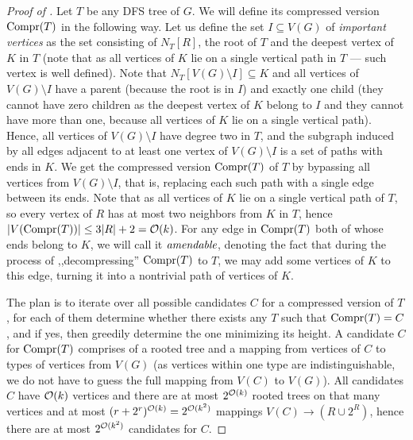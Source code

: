 \documentclass[a4paper,11pt]{article}
\begin{document}
\begin{proof}[Proof of ]
Let $T$ be any DFS tree of $G$. We will define its compressed version $\mathrm{Compr}(T)$ in the following way. Let us define the set $I \subseteq V(G)$ of \emph{important vertices} as the set consisting of $N_T[R]$, the root of $T$ and the deepest vertex of $K$ in $T$ (note that as all vertices of $K$ lie on a single vertical path in $T$ --- such vertex is well defined). Note that $N_T[V(G) \setminus I] \subseteq K$ and all vertices of $V(G) \setminus I$ have a parent (because the root is in $I$) and exactly one child (they cannot have zero children as the deepest vertex of $K$ belong to $I$ and they cannot have more than one, because all vertices of $K$ lie on a single vertical path). Hence, all vertices of $V(G) \setminus I$ have degree two in $T$, and the subgraph induced by all edges adjacent to at least one vertex of $V(G) \setminus I$ is a set of paths with ends in $K$. We get the compressed version $\mathrm{Compr}(T)$ of $T$ by bypassing all vertices from $V(G) \setminus I$, that is, replacing each such path with a single edge between its ends. 
Note that as all vertices of $K$ lie on a single vertical path of $T$, so every vertex of $R$ has at most two neighbors from $K$ in $T$, hence $|V(\mathrm{Compr}(T))| \le 3|R|+2 = {\mathcal{O}}(k)$. 
For any edge in $\mathrm{Compr}(T)$ both of whose ends belong to $K$, we will call it $\emph{amendable}$, denoting the fact that during the process of ,,decompressing'' $\mathrm{Compr}(T)$ to $T$, we may add some vertices of $K$ to this edge, turning it into a nontrivial path of vertices of $K$.

The plan is to iterate over all possible candidates $C$ for a compressed version of $T$, for each of them determine whether there exists any $T$ such that $\mathrm{Compr}(T) = C$, and if yes, then greedily determine the one minimizing its height. A candidate $C$ for $\mathrm{Compr}(T)$ comprises of a rooted tree and a mapping from vertices of $C$ to types of vertices from $V(G)$ (as vertices within one type are indistinguishable, we do not have to guess the full mapping from $V(C)$ to $V(G)$). All candidates $C$ have ${\mathcal{O}}(k)$ vertices and there are at most $2^{{\mathcal{O}}(k)}$ rooted trees on that many vertices and at most $(r+2^r)^{{\mathcal{O}}(k)} = 2^{{\mathcal{O}}(k^2)}$ mappings $V(C) \to (R \cup 2^R)$, hence there are at most $2^{{\mathcal{O}}(k^2)}$ candidates for $C$. 


\end{proof}
\end{document}
